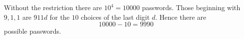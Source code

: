 Without the restriction there are $10^4=10000$ passwords. Those beginning with $9,1,1$ are $911d$ for the $10$ choices of the last digit $d$. Hence there are
\[
10000-10=\boxed{9990}
\]
possible passwords.
